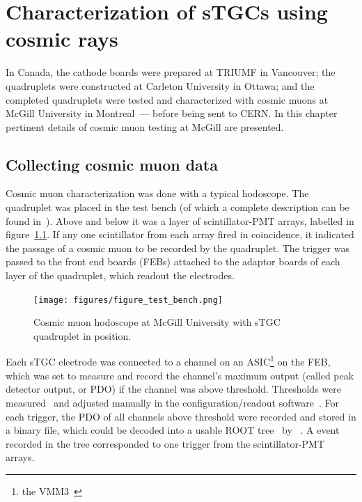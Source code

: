 

\chapter{Characterization of sTGCs using cosmic rays}
\label{chap:cosmics}

In Canada, the cathode boards were prepared at TRIUMF in Vancouver; the quadruplets were constructed at Carleton University in Ottawa; and the completed quadruplets were tested and characterized with cosmic muons at McGill University in Montreal~--- before being sent to CERN. In this chapter pertinent details of cosmic muon testing at McGill are presented. 

\section{Collecting cosmic muon data}

Cosmic muon characterization was done with a typical hodoscope.  The quadruplet was placed in the test bench (of which a complete description can be found in~\cite{lefebvre_thesis}). Above and below it was a layer of scintillator-PMT arrays, labelled in figure~\ref{fig:hodoscope}. If any one scintillator from each array fired in coincidence, it indicated the passage of a cosmic muon to be recorded by the quadruplet. The trigger was passed to the front end boards (FEBs) attached to the adaptor boards of each layer of the quadruplet, which readout the electrodes.

\begin{figure}
    \centering
    \texttt{[image: figures/figure\_test\_bench.png]}
    \caption{Cosmic muon hodoscope at McGill University with sTGC quadruplet in position.}
    \label{fig:hodoscope}
\end{figure}

Each sTGC electrode was connected to a channel on an ASIC\footnote{the VMM3~\cite{iakovidis_vmm3_2017}} on the FEB, which was set to measure and record the channel's maximum output (called peak detector output, or PDO) if the channel was above threshold. Thresholds were measured~\cite{chen_calibration_2019} and adjusted manually in the configuration/readout software~\cite{siyuan_sun_stgc_readout_sw}. For each trigger, the PDO of all channels above threshold were recorded and stored in a binary file, which could be decoded into a usable ROOT tree~\cite{ROOT} by ~\cite{lefebvre_tgc_analysis}. A event recorded in the tree corresponded to one trigger from the scintillator-PMT arrays. 

